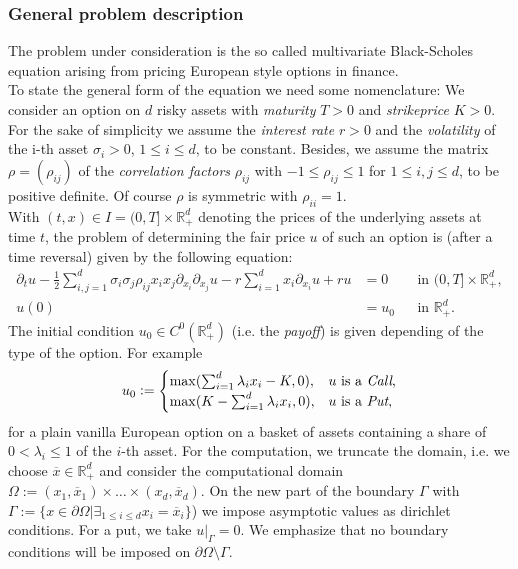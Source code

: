 \subsubsection{General problem description}

The problem under consideration is the so called multivariate Black-Scholes equation arising from pricing European style options in finance.  \\
To state the general form of the equation we need some nomenclature: We consider an option on $d$ risky assets with {\it maturity} $T>0$ and {\it strikeprice} $K>0$. For the sake of simplicity we assume the {\it interest rate} $r>0$ and the {\it volatility} of the i-th asset $\sigma_i>0$, $1\leq i\leq d$, to be constant. Besides, we assume the matrix $\rho=(\rho_{ij})$ of the {\it correlation factors} $\rho_{ij}$ with  $-1\leq \rho_{ij}\leq 1$ for  $1\leq i,j \leq d$, to be positive definite. Of course $\rho$ is symmetric with $\rho_{ii}=1$.\\ 
With $(t,x) \in I=(0,T] \times \mathbb{R}^d_+$ denoting the prices of the underlying assets at time $t$, the problem of determining the fair price $u$ of such an option is (after a time reversal) given by the following equation:
\begin{subequations}
\begin{align} 
   \partial_t{u}-\frac12\sum_{i,j=1}^d \sigma_i\sigma_j\rho_{ij}x_ix_j \partial_{{x_i}}\partial_{x_j}u-r\sum_{i=1}^dx_i\partial_{x_i}{u}+ru&=0 &&\mbox{in } (0,T]\times \mathbb{R}_+^d,\\
   u(0)&=u_0 &&\mbox{in } \mathbb{R}_+^d.
\end{align}
\end{subequations}
The initial condition $u_0\in C^{0}\left({\mathbb{R}_+^d}\right) $ (i.e. the {\it payoff}) is given depending of the type of the option. For example
\begin{equation}
u_0 :=\begin{cases} 
\max(\sum_{i=1}^d \lambda_i x_i-K,0),&  u\text{ is a \textit{Call},}\\
\max(K-\sum_{i=1}^d\lambda_i x_i,0),& u\text{ is a \textit{Put},}
\end{cases}
\end{equation}  
for a plain vanilla European option on a basket of assets containing a share of $0<\lambda_i\leq 1$ of the $i$-th asset. For the computation, we truncate the domain, i.e. we choose $\overline x \in \mathbb{R}^d_+$ and consider the computational domain $\Omega := (x_1, \overline x_1)\times \dots \times (x_d, \overline x_d)$. On the new part of the boundary $\Gamma$ with $\Gamma :=\{x\in \partial\Omega |\exists_{1\leq i\leq d}  x_i=\overline x_i\}$) we impose asymptotic values as dirichlet conditions. For a put, we take $u|_\Gamma=0$. We emphasize that no boundary conditions will be imposed on $\partial \Omega \setminus \Gamma$.\\
